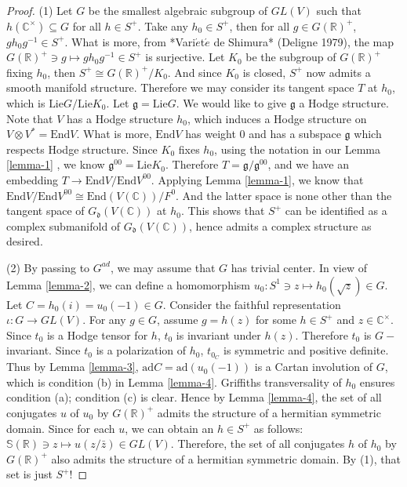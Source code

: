 \begin{proof}
(1) Let $G$ be the smallest algebraic subgroup of $GL(V)$ such that $h(\mathbb C^ \times) \subseteq G$ for all $h \in S^+$.  Take any $h_0 \in S^+$, then for all $g \in G(\mathbb R)^+$, $gh_0g^{-1}\in S^+$. What is more, from *Vari$\acute e$t$\acute e$ de Shimura* (Deligne 1979), the map $G(\mathbb R)^+ \ni g\mapsto gh_0g^{-1} \in S^+$ is surjective. Let $K_0$ be the subgroup of $G(\mathbb R)^+$ fixing $h_0$, then $S^+ \cong G(\mathbb R)^+/K_0$. And since $K_0$ is closed, $S^+$ now admits a smooth manifold structure. Therefore we may consider its tangent space $T$ at $h_0$, which is $\text{Lie}G/\text{Lie}K_0$. Let $\mathfrak g=\text{Lie}G$. We would like to give $\mathfrak g$ a Hodge structure. Note that $V$ has a Hodge structure $h_0$, which induces a Hodge structure on $V\otimes V ^* =\text{End}V$. What is more, $\text{End}V$ has weight 0 and has a subspace $\mathfrak g$ which respects Hodge structure. Since $K_0$ fixes $h_0$, using the notation in our Lemma \ref{lemma-1} , we know $\mathfrak g ^{00}=\text{Lie}K_0$. Therefore $T=\mathfrak g /\mathfrak g ^{00}$, and we have an embedding $T \to \text{End}V/\text{End}V^{00}$. Applying Lemma \ref{lemma-1}, we know that $\text{End}V/\text{End}V^{00} \cong \text{End}(V(\mathbb C))/F^0$. And the latter space is none other than the tangent space of $G_ \mathfrak d(V(\mathbb C))$ at $h_0$. This shows that $S^+$ can be identified as a complex submanifold of $G_ \mathfrak d(V(\mathbb C))$, hence admits a complex structure as desired.

(2) By passing to $G^{ad}$, we may assume that $G$ has trivial center. In view of Lemma \ref{lemma-2}, we can define a homomorphism $u_0:S^1 \ni z\mapsto h_0(\sqrt z) \in G$. Let $C=h_0(i)=u_0(-1)\in G$.  Consider the faithful representation $\iota: G \to GL(V)$. For any $g\in G$, assume $g=h(z)$ for some $h\in S^+$ and $z\in \mathbb C^ \times$. Since $t_0$ is a Hodge tensor for $h$, $t_0$ is invariant under $h(z)$. Therefore $t_0$ is $G-$ invariant.  Since $t_0$ is a polarization of $h_0$, $t_{0_C}$ is symmetric and positive definite. Thus by Lemma \ref{lemma-3}, $\text{ad}C=\text{ad}(u_0(-1))$ is a Cartan involution of $G$, which is condition (b) in Lemma \ref{lemma-4}. Griffiths transversality of $h_0$ ensures condition (a); condition (c) is clear. Hence by Lemma \ref{lemma-4}, the set of all conjugates $u$ of $u_0$ by $G(\mathbb R)^+$ admits the structure of a hermitian symmetric domain.  Since for each $u$, we can obtain an $h\in S^+$ as follows: $\mathbb S(\mathbb R) \ni z  \mapsto u(z/\bar z)\in GL(V)$. Therefore, the set of all conjugates $h$ of $h_0$ by $G(\mathbb R)^+$ also admits the structure of a hermitian symmetric domain. By (1), that set is just $S^+$!


\end{proof}
